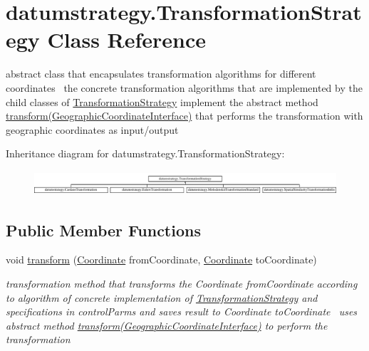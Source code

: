 \hypertarget{classdatumstrategy_1_1_transformation_strategy}{}\section{datumstrategy.\+Transformation\+Strategy Class Reference}
\label{classdatumstrategy_1_1_transformation_strategy}


abstract class that encapsulates transformation algorithms for different coordinates~\newline
 the concrete transformation algorithms that are implemented by the child classes of \hyperlink{classdatumstrategy_1_1_transformation_strategy}{Transformation\+Strategy} implement the abstract method \hyperlink{classdatumstrategy_1_1_transformation_strategy_a0fd1d6fbba01e5222360740e34eae786}{transform(\+Geographic\+Coordinate\+Interface)} that performs the transformation with geographic coordinates as input/output  


Inheritance diagram for datumstrategy.\+Transformation\+Strategy\+:\begin{figure}[H]
\begin{center}
\leavevmode
\includegraphics[height=0.921053cm]{classdatumstrategy_1_1_transformation_strategy}
\end{center}
\end{figure}
\subsection*{Public Member Functions}
\begin{DoxyCompactItemize}
\item 
void \hyperlink{classdatumstrategy_1_1_transformation_strategy_a99e23d291f37ed720a9e31d33f54c834}{transform} (\hyperlink{classcoordinates_1_1_coordinate}{Coordinate} from\+Coordinate, \hyperlink{classcoordinates_1_1_coordinate}{Coordinate} to\+Coordinate)
\begin{DoxyCompactList}\small\item\em transformation method that transforms the Coordinate from\+Coordinate according to algorithm of concrete implementation of \hyperlink{classdatumstrategy_1_1_transformation_strategy}{Transformation\+Strategy} and specifications in control\+Parms and saves result to Coordinate to\+Coordinate~\newline
 uses abstract method \hyperlink{classdatumstrategy_1_1_transformation_strategy_a0fd1d6fbba01e5222360740e34eae786}{transform(\+Geographic\+Coordinate\+Interface)} to perform the transformation \end{DoxyCompactList}\end{DoxyCompactItemize}
